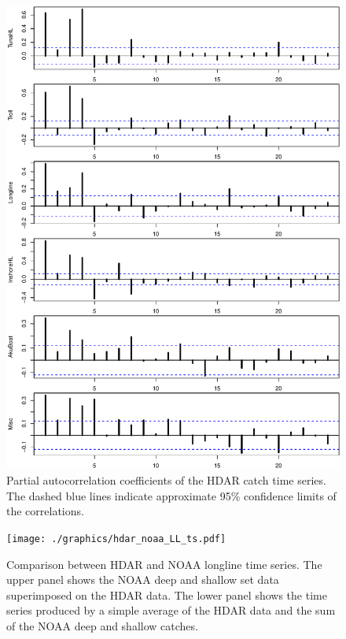 \documentclass[12pt,letterpaper]{article}
\begin{document}
\begin{figure}
\begin{center}
\includegraphics[height=0.8\textheight]{./graphics/partial_acf.pdf}
\caption{\label{fig:catchPACF}
Partial autocorrelation coefficients of the HDAR catch time series. The
dashed blue lines indicate approximate 95\% confidence limits of the
correlations.}
\end{center}
\end{figure}

\begin{figure}
\begin{center}
\texttt{[image: ./graphics/hdar\_noaa\_LL\_ts.pdf]}
\caption{\label{fig:hdarnoaaLLTS}
Comparison between HDAR and NOAA longline time series. The upper panel
shows the NOAA deep and shallow set data superimposed on the HDAR
data. The lower panel shows the time series produced by a simple
average of the HDAR data and the sum of the NOAA deep and shallow
catches.}
\end{center}
\end{figure}
\end{document}
